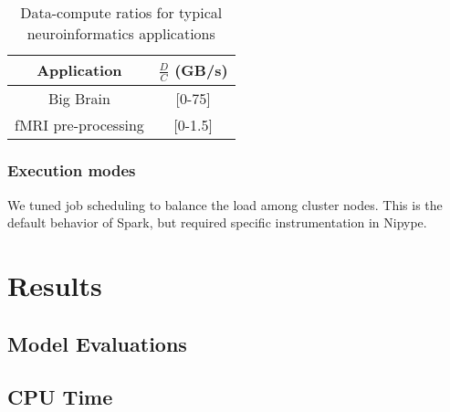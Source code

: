 \documentclass{IEEEtran}
\begin{document}


\begin{table}
\centering
\begin{tabular}{c|c}
Application & $\frac{D}{C}$ (GB/s)\\
\hline
Big Brain            & [0-75] \\
fMRI pre-processing  & [0-1.5]
\end{tabular}
\label{table:applications}
\caption{Data-compute ratios for typical neuroinformatics applications}
\end{table}

\subsubsection{Execution modes} %

We tuned job scheduling to balance the load among
cluster nodes. This is the default behavior of Spark, but required
specific instrumentation in Nipype.






\section{Results} %
\label{sec:results}


\subsection{Model Evaluations}

\subsection{CPU Time}
%
\end{document}
